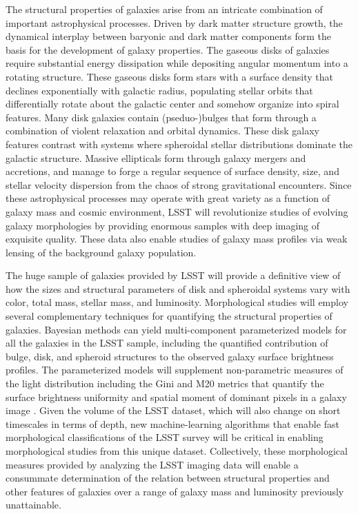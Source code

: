 {The structural properties of galaxies arise from
an intricate combination of important astrophysical
processes. Driven by dark matter structure growth, the dynamical
interplay between baryonic and dark matter components form
the basis for the development of galaxy properties.
The gaseous disks of galaxies require
substantial energy dissipation while depositing
angular momentum into a rotating structure. These
gaseous disks form stars with a
surface density that declines exponentially with
galactic radius, populating stellar orbits that
differentially rotate about the galactic center and
somehow organize into spiral features.
Many disk galaxies contain (pseduo-)bulges that form through
a combination of violent relaxation and orbital dynamics.
These disk galaxy features contrast with systems where
spheroidal stellar distributions dominate the galactic
structure. Massive ellipticals form through galaxy
mergers and accretions, and manage to forge a regular
sequence of surface density, size, and stellar velocity
dispersion from the chaos of strong gravitational
encounters. Since these astrophysical
processes may operate with great
variety as a function of galaxy mass and
cosmic environment, LSST will revolutionize studies
of evolving galaxy morphologies by providing enormous
samples with deep imaging of exquisite quality. These data also enable 
studies of galaxy mass profiles via weak lensing of the background
galaxy population.

The huge sample of galaxies provided by LSST will
provide a definitive view of how the sizes and
structural parameters of disk and spheroidal systems
vary with color, total mass, stellar mass, and luminosity. 
Morphological studies will employ several complementary techniques for quantifying the 
structural properties of galaxies. Bayesian
methods can yield multi-component
parameterized models for all the galaxies
in the LSST sample, including the quantified
contribution of bulge, disk, and
spheroid structures to the observed galaxy
surface brightness profiles. The parameterized
models will supplement non-parametric measures
of the light distribution including the
Gini and M20 metrics that quantify the surface
brightness uniformity and spatial moment of
dominant pixels in a galaxy image \citep{abraham2003a,lotz2004a}. Given the volume of the LSST dataset, which will also change on short timescales in terms of depth, new machine-learning algorithms \citep[e.g.][; Hausen \& Robertson, in prep]{hocking2015a} that enable fast morphological classifications of the LSST survey will be critical in enabling morphological studies from this unique dataset. Collectively, these morphological measures provided
by analyzing the LSST imaging data will enable
a consummate determination of the relation between
structural properties and other features of
galaxies over a range of galaxy mass and luminosity
previously unattainable. 

}
